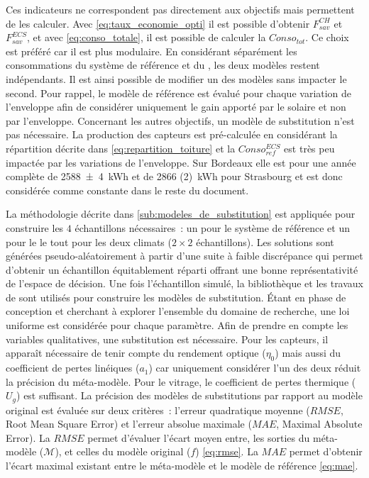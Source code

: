Ces indicateurs ne correspondent pas directement aux objectifs mais permettent de les calculer.
Avec \eqref{eq:taux_economie_opti} il est possible d’obtenir $F_{sav}^{CH}$ et $F_{sav}^{ECS}$,
et avec \eqref{eq:conso_totale}, il est possible de calculer la $Conso_{tot}$.
Ce choix est préféré car il est plus modulaire. En considérant séparément les consommations
du système de référence et du , les deux modèles restent indépendants. Il est
ainsi possible de modifier un des modèles sans impacter le second. Pour rappel, le
modèle de référence est évalué pour chaque variation de l’enveloppe afin de considérer
uniquement le gain apporté par le solaire et non par l’enveloppe.
Concernant les autres objectifs, un modèle de substitution n’est pas nécessaire. La
production des capteurs  est pré-calculée en considérant la répartition décrite
dans \eqref{eq:repartition_toiture} et la $Conso_{ref}^{ECS}$ est très peu impactée par
les variations de l’enveloppe. Sur Bordeaux elle est pour une année complète de \SI{2588(4)}{kWh}
et de \SI{2866 (2)}{kWh} pour Strasbourg et est donc considérée comme constante
dans le reste du document.

La méthodologie décrite dans \ref{sub:modeles_de_substitution} est appliquée pour
construire les $4$ échantillons nécessaires~: un pour le système de référence et un pour
le  le tout pour les deux climats ($2 \times 2$ échantillons). Les solutions sont
générées pseudo-aléatoirement à partir d’une suite à faible discrépance qui permet
d’obtenir un échantillon équitablement réparti offrant une bonne représentativité de
l’espace de décision. Une fois l’échantillon simulé, la bibliothèque
 et les travaux de \textcite{Merheb2013}
sont utilisés pour construire les modèles de substitution. Étant en phase de conception
et cherchant à explorer l’ensemble du domaine de recherche, une loi uniforme est
considérée pour chaque paramètre. Afin de prendre en compte les variables qualitatives,
une substitution est nécessaire. Pour les capteurs, il apparaît nécessaire de tenir compte
du rendement optique ($\eta_{0}$) mais aussi du coefficient de pertes linéiques ($a_{1}$)
car uniquement considérer l’un des deux réduit la précision du méta-modèle. Pour le
vitrage, le coefficient de pertes thermique ($U_{g}$) est suffisant. La précision des
modèles de substitutions par rapport au modèle original est évaluée sur deux critères~:
l’erreur quadratique moyenne ($RMSE$, Root Mean Square Error) et l’erreur absolue maximale
($MAE$, Maximal Absolute Error). La $RMSE$ permet d’évaluer l’écart moyen entre, les
sorties du méta-modèle ($\mathcal{M}$), et celles du modèle original ($f$)
\eqref{eq:rmse}. La $MAE$ permet d’obtenir l’écart maximal existant entre le méta-modèle
et le modèle de référence \eqref{eq:mae}.

